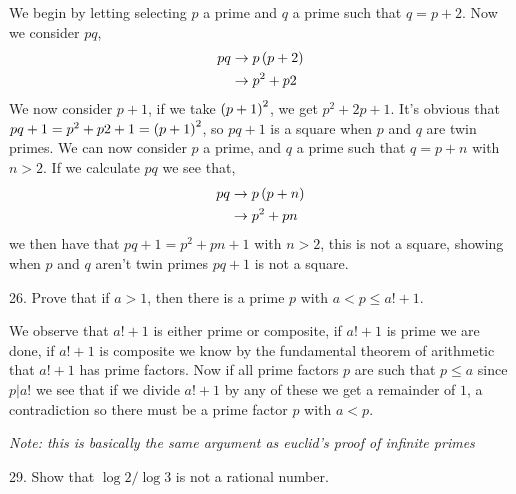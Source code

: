 \begin{mdframed}[style=darkAnswer,frametitle={Joe Starr}]
  We begin by letting selecting $p$ a prime and $q$ a prime such that $q=p+2$.
  Now we consider $pq$,
  \begin{align*}
    pq & \rightarrow p\left(p+2\right) \\
       & \rightarrow p^2+p2     \\
  \end{align*}
  We now consider $p+1$, if we take $\left(p+1\right)^2$, we get $p^2+2p+1$. It's
  obvious that $pq+1=p^2+p2+1=\left(p+1\right)^2$, so $pq+1$ is a square when $p$ and $q$ are
  twin primes.
  We can now consider $p$ a prime, and $q$ a prime such that $q=p+n$ with
  $n>2$. If we calculate $pq$ we see that,
  \begin{align*}
    pq & \rightarrow p\left(p+n\right) \\
       & \rightarrow p^2+pn     \\
  \end{align*}
  we then have that $pq+1=p^2+pn+1$ with $n>2$, this is not a square, showing
  when $p$ and $q$ aren't twin primes $pq+1$ is not a square.
\end{mdframed}
\newpage
\begin{mdframed}[style=darkQuesion]
  26. Prove that if $a>1$, then there is a prime $p$ with $a<p\leq a!+1$.
\end{mdframed}

\begin{mdframed}[style=darkAnswer,frametitle={Joe Starr}]
  We observe that $a!+1$ is either prime or composite, if $ a!+1$ is prime
  we are done, if $ a!+1$ is composite we know by the fundamental theorem
  of arithmetic that $ a!+1$ has prime factors. Now if all prime factors $p$
  are such that $p\leq a$ since $p\vert a!$ we see that if we divide $a!+1$ by
  any of these we get a remainder of $1$, a contradiction so there must be
  a prime factor $p$ with $a<p$.

  \textit{Note: this is basically the same argument as euclid's proof of
    infinite primes}
\end{mdframed}
\newpage
\begin{mdframed}[style=darkQuesion]
  29. Show that $\log{2}/\log{3}$ is not a rational number.
\end{mdframed}

